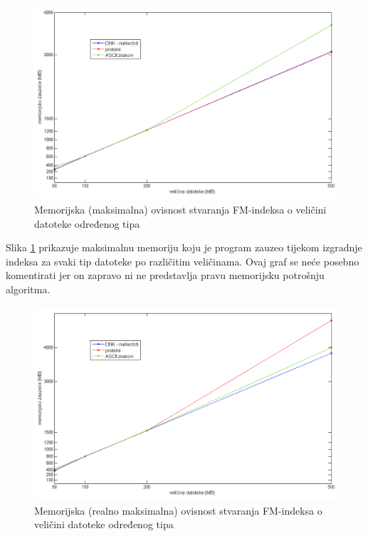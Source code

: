 \begin{figure}[H]
   \centering
       \includegraphics[width=\textwidth]{./pictures/test_mem_pravo.png}
 \caption{Memorijska (maksimalna) ovisnost stvaranja FM-indeksa o veličini datoteke određenog tipa}
 \label{fig:test_mem_pravo}
\end{figure}

Slika \ref{fig:test_mem_pravo} prikazuje maksimalnu memoriju koju je program zauzeo tijekom izgradnje indeksa za svaki tip datoteke po različitim veličinama. Ovaj graf se neće posebno komentirati jer on zapravo ni ne predstavlja pravu memorijsku potrošnju algoritma.


\begin{figure}[H]
   \centering
       \includegraphics[width=\textwidth]{./pictures/test_mem_max.png}
 \caption{Memorijska (realno maksimalna) ovisnost stvaranja FM-indeksa o veličini datoteke određenog tipa}
 \label{fig:test_mem_max}
\end{figure}

